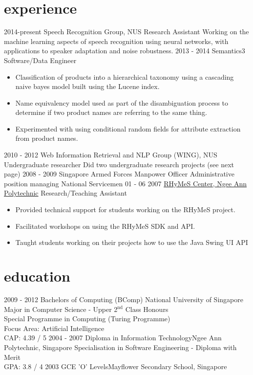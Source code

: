 \documentclass[]{friggeri-cv}
\begin{document}
\section{experience}

\begin{entrylist}
	\entry
	{2014-present}
	{Speech Recognition Group, NUS}
	{Research Assistant}
	{Working on the machine learning aspects of speech recognition using neural 
	networks, with applications to speaker adaptation and noise robustness.}
	\entry
	{2013 - 2014}
	{Semantics3}
	{Software/Data Engineer}
	{\begin{itemize}[itemsep=0pt,topsep=0pt]
			\item Classification of products into a hierarchical taxonomy using 
				a cascading naive bayes model built using the Lucene index.
			\item Name equivalency model used as part of the disambiguation 
				process to determine if two product names are referring to the 
				same thing.
			\item Experimented with using conditional random fields for 
				attribute extraction from product names.
		\end{itemize}
	}
	\entry
	{2010 - 2012}
	{Web Information Retrieval and NLP Group (WING), NUS}
	{Undergraduate researcher}
	{Did two undergraduate research projects (see next page)}
	\entry
	{2008 - 2009}
	{Singapore Armed Forces}
	{Manpower Officer}
	{Administrative position managing National Servicemen}
	\entry
	{01 - 06 2007}
	{\href{http://www.np.edu.sg/ict/facilities/rhymes/Pages/loc\_rhymes.aspx}{RHyMeS 
	Center, Ngee Ann Polytechnic}}
	{Research/Teaching Assistant}
	{
		\begin{itemize}[itemsep=0pt,topsep=0pt]
			\item Provided technical support for students working on the RHyMeS 
				project.
			\item Facilitated workshops on using the RHyMeS SDK and API.
			\item  Taught students working on their projects how to use the Java 
				Swing UI API
		\end{itemize}
	}
\end{entrylist}
\pagebreak
\section{education}
\begin{entrylist}
	\entry
	{2009 - 2012}
	{Bachelors of Computing (BComp)}
	{National University of Singapore}
	{
		Major in Computer Science - Upper 2$^{\text{nd}}$ Class Honours \\
		Special Programme in Computing (Turing Programme) \\
		Focus Area: Artificial Intelligence\\
		CAP: 4.39 / 5
	}
	\entry
	{2004 - 2007}
	{Diploma in Information Technology}{Ngee Ann Polytechnic, Singapore}
	{
		Specialisation in Software Engineering - Diploma with Merit\\
		GPA: 3.8 / 4
	}
	\entry
	{2003}
	{GCE 'O' Levels}{Mayflower Secondary School, Singapore}
	{}
\end{entrylist}
\end{document}

